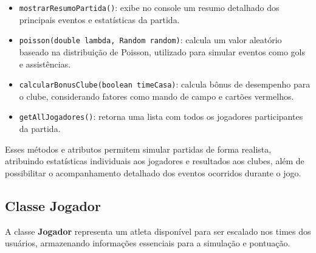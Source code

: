\documentclass[12pt]{article}
\begin{document}
\begin{itemize}
\begin{itemize}
          \item \texttt{mostrarResumoPartida()}: exibe no console um resumo detalhado dos principais eventos e estatísticas da partida.
          \item \texttt{poisson(double lambda, Random random)}: calcula um valor aleatório baseado na distribuição de Poisson, utilizado para simular eventos como gols e assistências.
          \item \texttt{calcularBonusClube(boolean timeCasa)}: calcula bônus de desempenho para o clube, considerando fatores como mando de campo e cartões vermelhos.
          \item \texttt{getAllJogadores()}: retorna uma lista com todos os jogadores participantes da partida.
        \end{itemize}
\end{itemize}

Esses métodos e atributos permitem simular partidas de forma realista, atribuindo estatísticas individuais aos jogadores e resultados aos clubes, além de possibilitar o acompanhamento detalhado dos eventos ocorridos durante o jogo.

\subsection{Classe Jogador}

A classe \textbf{Jogador} representa um atleta disponível para ser escalado nos times dos usuários, armazenando informações essenciais para a simulação e pontuação.
\end{document}
